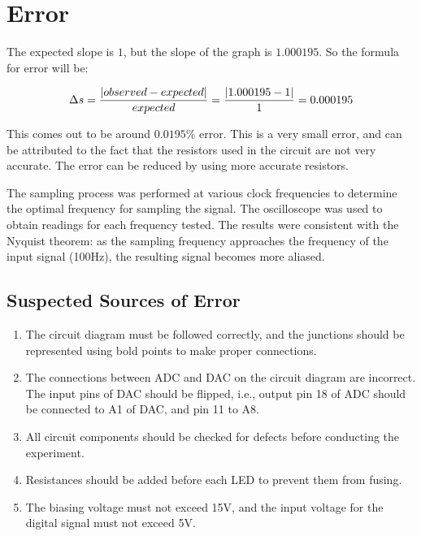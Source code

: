 \section{Error}
	The expected slope is $1$, but the slope of the graph is $1.000195$. So the formula for error will be:

	$$\Delta s = \frac{\abs{observed - expected}}{expected} = \frac{\abs{1.000195 - 1}}{1} = 0.000195$$

	This comes out to be around $0.0195\%$ error. This is a very small error, and can be attributed to the fact that the resistors used in the circuit are not very accurate. The error can be reduced by using more accurate resistors.

	The sampling process was performed at various clock frequencies to determine the optimal frequency for sampling the signal. The oscilloscope was used to obtain readings for each frequency tested. The results were consistent with the Nyquist theorem: as the sampling frequency approaches the frequency of the input signal (100Hz), the resulting signal becomes more aliased.

	\subsection{Suspected Sources of Error}

		\begin{enumerate}
			\item The circuit diagram must be followed correctly, and the junctions should be represented using bold points to make proper connections.
			\item The connections between ADC and DAC on the circuit diagram are incorrect. The input pins of DAC should be flipped, i.e., output pin 18 of ADC should be connected to A1 of DAC, and pin 11 to A8.
			\item All circuit components should be checked for defects before conducting the experiment.
			\item Resistances should be added before each LED to prevent them from fusing.
			\item The biasing voltage must not exceed 15V, and the input voltage for the digital signal must not exceed 5V.
		\end{enumerate}